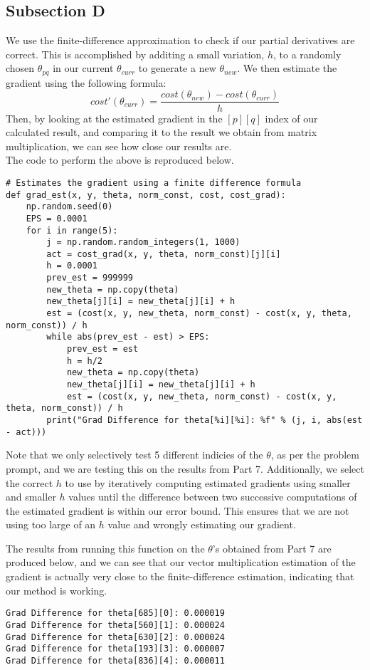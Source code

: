 \documentclass[11pt,a4paper]{report}
\begin{document}
\subsection*{Subsection D}
We use the finite-difference approximation to check if our partial derivatives are correct. This is accomplished by additing a small variation, $h$, to a randomly chosen $\theta_{pq}$ in our current $\theta_{curr}$ to generate a new $\theta_{new}$. We then estimate the gradient using the following formula:
\begin{equation}
cost'(\theta_{curr}) = \frac{cost(\theta_{new})-cost(\theta_{curr})}{h} 
\end{equation}
Then, by looking at the estimated gradient in the $[p][q]$ index of our calculated result, and comparing it to the result we obtain from matrix multiplication, we can see how close our results are.\\
The code to perform the above is reproduced below.
\begin{lstlisting}
# Estimates the gradient using a finite difference formula
def grad_est(x, y, theta, norm_const, cost, cost_grad):
    np.random.seed(0)
    EPS = 0.0001
    for i in range(5):
        j = np.random.random_integers(1, 1000)
        act = cost_grad(x, y, theta, norm_const)[j][i]
        h = 0.0001
        prev_est = 999999
        new_theta = np.copy(theta)
        new_theta[j][i] = new_theta[j][i] + h
        est = (cost(x, y, new_theta, norm_const) - cost(x, y, theta, norm_const)) / h
        while abs(prev_est - est) > EPS:
            prev_est = est
            h = h/2
            new_theta = np.copy(theta)
            new_theta[j][i] = new_theta[j][i] + h
            est = (cost(x, y, new_theta, norm_const) - cost(x, y, theta, norm_const)) / h
        print("Grad Difference for theta[%i][%i]: %f" % (j, i, abs(est - act)))
\end{lstlisting}

Note that we only selectively test 5 different indicies of the $\theta$, as per the problem prompt, and we are testing this on the results from Part 7. Additionally, we select the correct $h$ to use by iteratively computing estimated gradients using smaller and smaller $h$ values until the difference between two successive computations of the estimated gradient is within our error bound. This ensures that we are not using too large of an $h$ value and wrongly estimating our gradient.

The results from running this function on the $\theta$'s obtained from Part 7 are produced below, and we can see that our vector multiplication estimation of the gradient is actually very close to the finite-difference estimation, indicating that our method is working.
\begin{lstlisting}
Grad Difference for theta[685][0]: 0.000019
Grad Difference for theta[560][1]: 0.000024
Grad Difference for theta[630][2]: 0.000024
Grad Difference for theta[193][3]: 0.000007
Grad Difference for theta[836][4]: 0.000011
\end{lstlisting}
\end{document}

